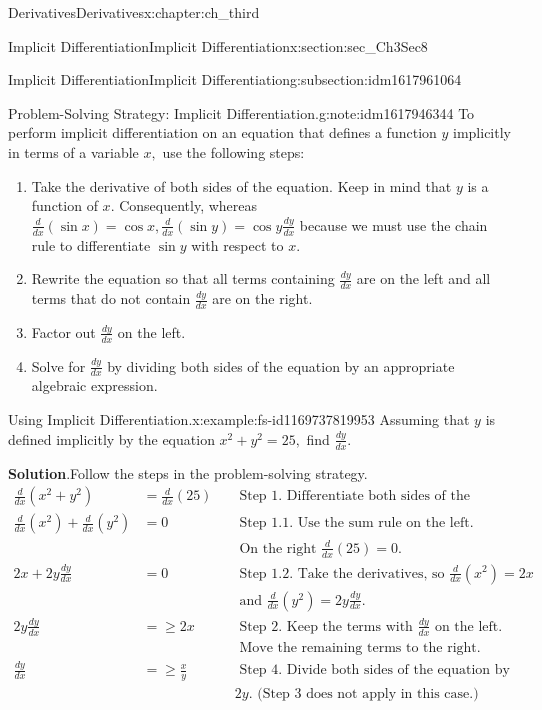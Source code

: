 \documentclass[oneside,10pt,]{book}
\newcommand{\blocktitlefont}{\relax}
\numberwithin{equation}{section}
\newcommand{\amp}{&}
\begin{document}
\begin{chapterptx}{Derivatives}{}{Derivatives}{}{}{x:chapter:ch_third}
\begin{sectionptx}{Implicit Differentiation}{}{Implicit Differentiation}{}{}{x:section:sec_Ch3Sec8}
\begin{subsectionptx}{Implicit Differentiation}{}{Implicit Differentiation}{}{}{g:subsection:idm1617961064}
\begin{note}{Problem-Solving Strategy: Implicit Differentiation.}{g:note:idm1617946344}
To perform implicit differentiation on an equation that defines a function \(y\) implicitly in terms of a variable \(x,\) use the following steps:%
%
\begin{enumerate}
\item{}Take the derivative of both sides of the equation. Keep in mind that \(y\) is a function of \(x\). Consequently, whereas \(\frac{d}{dx}(\sin x)=\cos  x,\frac{d}{dx}(\sin y)=\cos  y\frac{dy}{dx}\) because we must use the chain rule to differentiate \(\sin y\) with respect to \(x.\)%
\item{}Rewrite the equation so that all terms containing \(\frac{dy}{dx}\) are on the left and all terms that do not contain \(\frac{dy}{dx}\) are on the right.%
\item{}Factor out \(\frac{dy}{dx}\) on the left.%
\item{}Solve for \(\frac{dy}{dx}\) by dividing both sides of the equation by an appropriate algebraic expression.%
\end{enumerate}
\end{note}
\begin{example}{Using Implicit Differentiation.}{x:example:fs-id1169737819953}%
Assuming that \(y\) is defined implicitly by the equation \(x^2+y^2=25,\) find \(\frac{dy}{dx}.\)%
\par\smallskip%
\noindent\textbf{\blocktitlefont Solution}.\hypertarget{g:solution:idm1617938280}{}\quad{}Follow the steps in the problem-solving strategy.%
%
\begin{align*}
\frac{d}{dx}(x^2+y^2)\amp=\frac{d}{dx}(25)\amp\amp\text{ Step 1. Differentiate both sides of the equation. }\\
\frac{d}{dx}(x^2)+\frac{d}{dx}(y^2)\amp= 0 \amp \amp\text{ Step 1.1. Use the sum rule on the left. }\\
\amp \amp \amp \text{ On the right } \frac{d}{dx}(25)=0.\\
2x+2y\frac{dy}{dx}\amp= 0\amp\amp \text{ Step 1.2. Take the derivatives, so } \frac{d}{dx}(x^2)=2x\\
\amp \amp \amp\text{ and } \frac{d}{dx}(y^2)=2y\frac{dy}{dx}.\\
2y\frac{dy}{dx}\amp= \geq 2x\amp\amp \text{ Step 2. Keep the terms with } \frac{dy}{dx} \text{ on the left. }\\
\amp \amp \amp\text{ Move the remaining terms to the right. }\\
\frac{dy}{dx}\amp=\geq \frac{x}{y}\amp \amp\text{ Step 4. Divide both sides of the equation by }\\
\amp \amp \amp2y. \text{ (Step 3 does not apply in this case.) }

\end{align*}
\end{example}
\end{subsectionptx}
\end{sectionptx}
\end{chapterptx}
\end{document}
